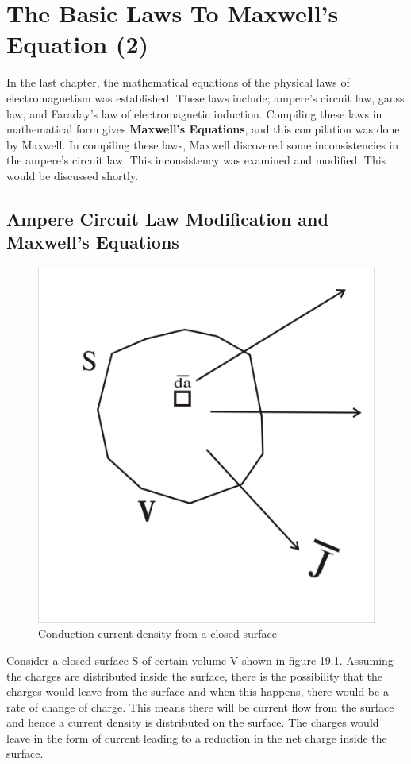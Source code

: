 \chapter{The Basic Laws To Maxwell's Equation (2)}\label{lec:lec19}
In the last chapter, the mathematical equations of the physical laws of electromagnetism was established. These laws include; ampere's circuit law, gauss law, and Faraday's law of electromagnetic induction. Compiling these laws in mathematical form gives \textbf{Maxwell's Equations}, and this compilation was done by Maxwell. In compiling these laws, Maxwell discovered some inconsistencies in the ampere's circuit law. This inconsistency was examined and modified. This would be discussed shortly.

\section{Ampere Circuit Law Modification and Maxwell's Equations}
\begin{figure}[h]
\centering
\includegraphics[width=.7\linewidth]{./graphics/closedsurface}
\caption{Conduction current density from a closed surface}
\end{figure}

Consider a closed surface S of certain volume V shown in figure 19.1. Assuming the charges are distributed inside the surface, there is the possibility that the charges would leave from the surface and when this happens, there would be a rate of change of charge. This means there will be current flow from the surface and hence a current density is distributed on the surface. The charges would leave in the form of current leading to a reduction in the net charge inside the surface.

